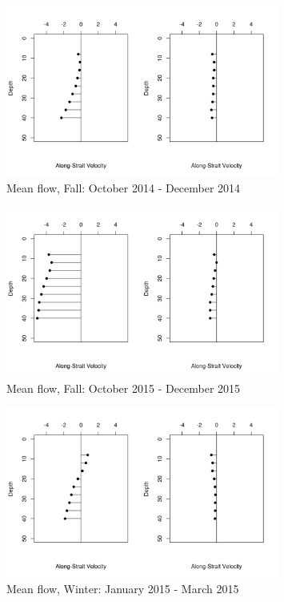 \documentclass[12pt]{dforeport}
\begin{document}
\begin{figure}  
\centering
\includegraphics[width = 0.8\textwidth]{./figures/40_smf_fall_2014.png}
\caption[Mean flow, Fall, 2014]{Mean flow, Fall: October 2014 - December 2014}
\label{f:smf_f_2014}
\end{figure}

\begin{figure}  
\centering
\includegraphics[width = 0.8\textwidth]{./figures/41_smf_fall_2015.png}
\caption[Mean flow, Fall, 2015]{Mean flow, Fall: October 2015 - December 2015}
\label{f:smf_f_2015}
\end{figure}


\begin{figure}  
\centering
\includegraphics[width = 0.8\textwidth]{./figures/42_smf_winter_2015.png}
\caption[Mean flow, Winter, 2015]{Mean flow, Winter: January 2015 - March 2015}
\label{f:smf_w_2015}
\end{figure}
\end{document}
